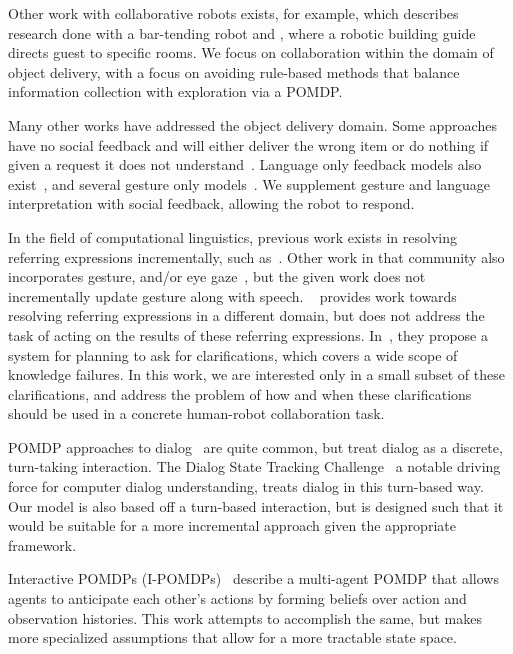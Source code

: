 \documentclass[conference]{IEEEtran}
\begin{document}
Other work with collaborative robots exists, for example, \citet{foster12} which describes research done with a bar-tending robot and \citet{bohus14}, where a robotic building guide directs guest to specific rooms. We focus on collaboration within the domain of object delivery, with a focus on avoiding rule-based methods that balance information collection with exploration via a POMDP. 

Many other works have addressed the object delivery domain. Some approaches have no social feedback and will either deliver the wrong item or do nothing if given a
request it does not understand~\citep{tellex11,matuszek12,tellex12,misra14}. Language only feedback models also 
exist~\citep{chai14,macmahon06,tellex11,matuszek12,guadarrama14,hewlett11,misra14}, and several gesture only models~\citep{waldherr00,marge11}. We supplement gesture and language interpretation with social feedback, allowing the robot to respond. 

In the field of computational linguistics, previous work exists in resolving referring expressions incrementally, such as~\citet{schlangen09,Zender2008Conceptual,Gieselmann}. Other work in that community also incorporates gesture, and/or eye gaze~\citet{kennington13,kennington15a}, but the given work does not incrementally update gesture along with speech. ~\cite{chairmi} provides work towards resolving referring expressions in a different domain, but does not address the task of acting on the results of these referring expressions. In~\citet{kruijffclarification}, they propose a system for planning to ask for clarifications, which covers a wide scope of knowledge failures. In this work, we are interested only in a small subset of these clarifications, and address the problem of how and when these clarifications should be used in a concrete human-robot collaboration task. 

POMDP approaches to dialog~\citep{young13} are quite common, but treat dialog
as a discrete, turn-taking interaction. The Dialog State Tracking
Challenge~\citep{williams2013dialog} a notable driving force for computer
dialog understanding, treats dialog in this turn-based way. Our model is also based off a turn-based interaction, but is designed such that it would be suitable for a more incremental approach given the appropriate framework. 

Interactive POMDPs (I-POMDPs)~\citep{gmytrasiewicz2005framework} describe a multi-agent POMDP that allows agents to anticipate each other's actions by forming beliefs over action and observation histories. This work attempts to accomplish the same, but makes more specialized assumptions that allow for a more tractable state space. 
\end{document}
